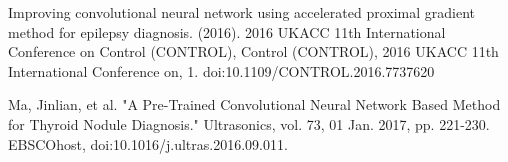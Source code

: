 \documentclass[conference]{IEEEtran}
\begin{document}
\begin{thebibliography}{1}
Improving convolutional neural network using accelerated proximal gradient method for epilepsy diagnosis. (2016). 2016 UKACC 11th International Conference on Control (CONTROL), Control (CONTROL), 2016 UKACC 11th International Conference on, 1. doi:10.1109/CONTROL.2016.7737620

Ma, Jinlian, et al. "A Pre-Trained Convolutional Neural Network Based Method for Thyroid Nodule Diagnosis." Ultrasonics, vol. 73, 01 Jan. 2017, pp. 221-230. EBSCOhost, doi:10.1016/j.ultras.2016.09.011.

\end{thebibliography}




\end{document}
